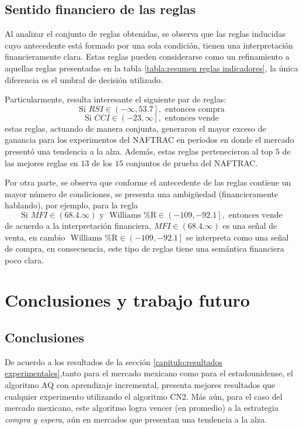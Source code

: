 \documentclass[12pt]{report}
\theoremstyle{break}
\theoremstyle{break}
\begin{document}
\section{Sentido financiero de las reglas}
\label{seccion:sentido financiero de las reglas}
Al analizar el conjunto de reglas obtenidas, se observa que las reglas inducidas cuyo antecedente está formado por una sola condición, tienen una interpretación financieramente clara. Estas reglas pueden considerarse como un refinamiento a aquellas reglas presentadas en la tabla \ref{tabla:resumen reglas indicadores}, la única diferencia es el umbral de decisión utilizado. 

Particularmente, resulta interesante el siguiente par de reglas:
$$
\mbox{Si } RSI \in \left(-\infty, 53.7\right], \mbox{ entonces compra}
$$
$$
\mbox{Si } CCI \in \left(-23, \infty \right], \mbox{ entonces vende}
$$
estas reglas, actuando de manera conjunta, generaron el mayor exceso de ganancia para los experimentos del NAFTRAC en períodos en donde el mercado presentó una tendencia a la alza. Además, estas reglas pertenecieron al top $5$ de las mejores reglas en $13$ de los $15$ conjuntos de prueba del NAFTRAC.

Por otra parte, se observa que conforme el antecedente de las reglas contiene un mayor número de condiciones, se presenta una ambigüedad (financieramente hablando), por ejemplo, para la regla
$$
\mbox{Si } MFI \in \left(68.4. \infty\right) \mbox{ y } \mbox{ Williams \%R} \in \left(-109, -92.1 \right], \mbox{ entonces vende}
$$
de acuerdo a la interpretación financiera, $MFI \in \left(68.4. \infty\right)$ es una señal de venta, en cambio $\mbox{ Williams \%R} \in \left(-109, -92.1 \right]$ se interpreta como una señal de compra, en consecuencia, este tipo de reglas tiene una semántica financiera poco clara.

\chapter[Capítulo \thechapter: Conclusiones y trabajo futuro]{Conclusiones y trabajo futuro}
\label{capitulo:conclusiones}
\section{Conclusiones}
\label{seccion:conclusiones}
De acuerdo a los resultados de la sección \ref{capitulo:resultados experimentales},tanto para el mercado mexicano como para el estadounidense, el algoritmo AQ con aprendizaje incremental, presenta mejores resultados que cualquier experimento utilizando el algoritmo CN2. Más aún, para el caso del mercado mexicano, este algoritmo logra vencer (en promedio) a la estrategia \textit{compra y espera}, aún en mercados que presentan una tendencia a la alza. 
\end{document}
